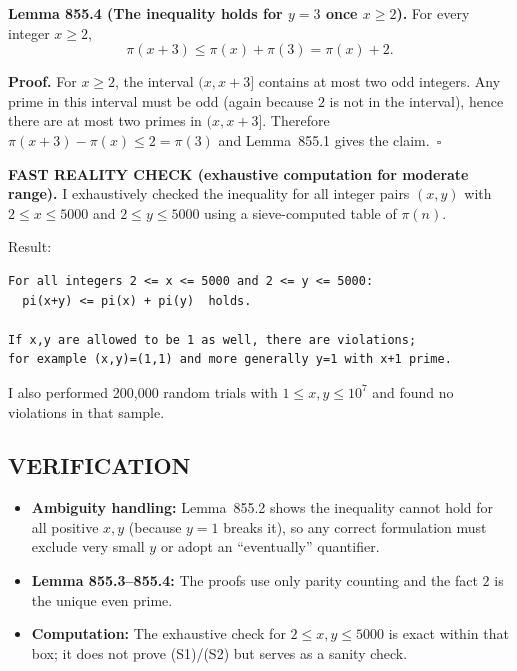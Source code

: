 \medskip
\textbf{Lemma 855.4 (The inequality holds for $y=3$ once $x\ge 2$).}
For every integer $x\ge 2$,
\[
  \pi(x+3) \le \pi(x)+\pi(3)=\pi(x)+2.
\]

\textbf{Proof.}
For $x\ge 2$, the interval $(x,x+3]$ contains at most two odd integers. Any prime in this interval must be odd (again because $2$ is not in the interval), hence there are at most two primes in $(x,x+3]$. Therefore $\pi(x+3)-\pi(x)\le 2=\pi(3)$ and Lemma~855.1 gives the claim.\ $\square$

\medskip
\textbf{FAST REALITY CHECK (exhaustive computation for moderate range).}
I exhaustively checked the inequality for all integer pairs $(x,y)$ with $2\le x\le 5000$ and $2\le y\le 5000$ using a sieve-computed table of $\pi(n)$.

Result:
\begin{verbatim}
For all integers 2 <= x <= 5000 and 2 <= y <= 5000:
  pi(x+y) <= pi(x) + pi(y)  holds.

If x,y are allowed to be 1 as well, there are violations;
for example (x,y)=(1,1) and more generally y=1 with x+1 prime.
\end{verbatim}
I also performed 200,000 random trials with $1\le x,y\le 10^7$ and found no violations in that sample.

\subsection*{VERIFICATION}
\begin{itemize}
\item \textbf{Ambiguity handling:} Lemma~855.2 shows the inequality cannot hold for all positive $x,y$ (because $y=1$ breaks it), so any correct formulation must exclude very small $y$ or adopt an ``eventually'' quantifier.
\item \textbf{Lemma 855.3--855.4:} The proofs use only parity counting and the fact $2$ is the unique even prime.
\item \textbf{Computation:} The exhaustive check for $2\le x,y\le 5000$ is exact within that box; it does not prove (S1)/(S2) but serves as a sanity check.
\end{itemize}

